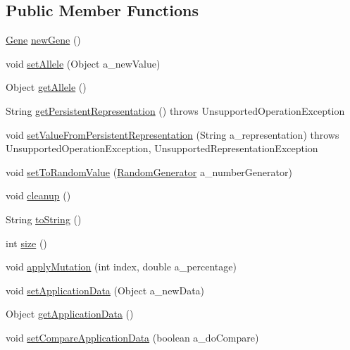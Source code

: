\subsection*{Public Member Functions}
\begin{DoxyCompactItemize}
\item 
\hyperlink{interfaceorg_1_1jgap_1_1_gene}{Gene} \hyperlink{interfaceorg_1_1jgap_1_1_gene_ae4ddccb7bf569c0ed6cdc19def590964}{new\-Gene} ()
\item 
void \hyperlink{interfaceorg_1_1jgap_1_1_gene_af46a0c31e0fecea483497e87ca278127}{set\-Allele} (Object a\-\_\-new\-Value)
\item 
Object \hyperlink{interfaceorg_1_1jgap_1_1_gene_aa06c80639659ddbcfa1cfe7b7bb109f9}{get\-Allele} ()
\item 
String \hyperlink{interfaceorg_1_1jgap_1_1_gene_a044aa8f0a04ee06bb04bbd35ad4c7f2f}{get\-Persistent\-Representation} ()  throws Unsupported\-Operation\-Exception
\item 
void \hyperlink{interfaceorg_1_1jgap_1_1_gene_a057e5d6cce5ae768cbf626e0ccf70520}{set\-Value\-From\-Persistent\-Representation} (String a\-\_\-representation)  throws Unsupported\-Operation\-Exception, Unsupported\-Representation\-Exception
\item 
void \hyperlink{interfaceorg_1_1jgap_1_1_gene_a4ef135da7549ee98139928e21adb841a}{set\-To\-Random\-Value} (\hyperlink{interfaceorg_1_1jgap_1_1_random_generator}{Random\-Generator} a\-\_\-number\-Generator)
\item 
void \hyperlink{interfaceorg_1_1jgap_1_1_gene_a5e353bbf6a9576b702bf466a5f952b82}{cleanup} ()
\item 
String \hyperlink{interfaceorg_1_1jgap_1_1_gene_ac62239b4b7bf81179fd491a4c4bd1901}{to\-String} ()
\item 
int \hyperlink{interfaceorg_1_1jgap_1_1_gene_a7a975e180dd0ac0fd33cdc182f64bea8}{size} ()
\item 
void \hyperlink{interfaceorg_1_1jgap_1_1_gene_af506b6e1d6ceb3e88e522da4c79adba4}{apply\-Mutation} (int index, double a\-\_\-percentage)
\item 
void \hyperlink{interfaceorg_1_1jgap_1_1_gene_ae8405395f244a18424794e8f2e36c608}{set\-Application\-Data} (Object a\-\_\-new\-Data)
\item 
Object \hyperlink{interfaceorg_1_1jgap_1_1_gene_a4eb1d079f14465a2324ad41a6ee3b77a}{get\-Application\-Data} ()
\item 
void \hyperlink{interfaceorg_1_1jgap_1_1_gene_a404ee1527c7dab2f8115f18507d0544b}{set\-Compare\-Application\-Data} (boolean a\-\_\-do\-Compare)

\end{DoxyCompactItemize}
